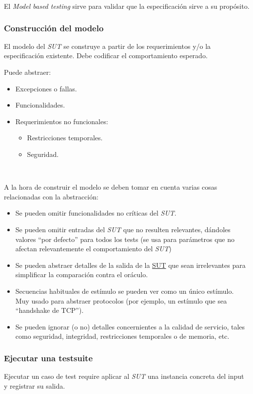 \documentclass[]{article}
\begin{document}
El \emph{Model based testing} sirve para validar que la especificación sirve a su propósito.

\subsubsection{Construcción del modelo}
El modelo del \textit{SUT} se construye a partir de los requerimientos y/o la especificación existente. Debe codificar el comportamiento esperado.

Puede abstraer:
\begin{itemize}
	\item Excepciones o fallas.
	\item Funcionalidades.
	\item Requerimientos no funcionales:
	\begin{itemize}
		\item Restricciones temporales.
		\item Seguridad.
	\end{itemize}
\end{itemize}

~\newline

A la hora de construir el modelo se deben tomar en cuenta varias cosas relacionadas con la abstracción:
\begin{itemize}
	\item Se pueden omitir funcionalidades no críticas del \textit{SUT}.
	\item Se pueden omitir entradas del \textit{SUT} que no resulten relevantes, dándoles valores ``por defecto'' para todos los tests (se usa para parámetros que no afectan relevantemente el comportamiento del \textit{SUT})
	\item Se pueden abstraer detalles de la salida de la \underline{SUT} que sean irrelevantes para simplificar la comparación contra el oráculo.
	\item Secuencias habituales de estímulo se pueden ver como un único estímulo. Muy usado para abstraer protocolos (por ejemplo, un estímulo que sea ``handshake de TCP'').
	\item Se pueden ignorar (o no) detalles concernientes a la calidad de servicio, tales como seguridad, integridad, restricciones temporales o de memoria, etc.
\end{itemize}

\subsubsection{Ejecutar una testsuite}
Ejecutar un caso de test require aplicar al \textit{SUT} una instancia concreta del input y registrar su salida.
\end{document}
